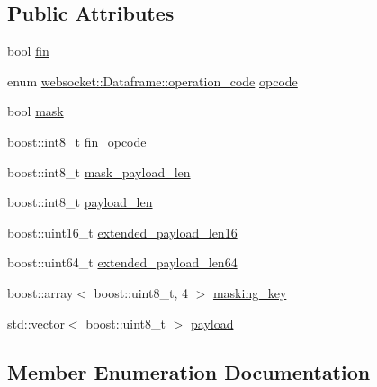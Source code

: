 \subsection*{Public Attributes}
\begin{DoxyCompactItemize}
\item 
bool \hyperlink{structwebsocket_1_1Dataframe_a76141c0d08271396a2497d5167b5c127}{fin}
\item 
enum \hyperlink{structwebsocket_1_1Dataframe_ab6f63b062b0aff036c2cbdecf160bd84}{websocket\+::\+Dataframe\+::operation\+\_\+code} \hyperlink{structwebsocket_1_1Dataframe_a5e3edcbe1a37e58024ec58f9f06dad38}{opcode}
\item 
bool \hyperlink{structwebsocket_1_1Dataframe_a49bc9113bc12db7e842ee0459f947aad}{mask}
\item 
boost\+::int8\+\_\+t \hyperlink{structwebsocket_1_1Dataframe_aae943445525774887619b133b4baed2d}{fin\+\_\+opcode}
\item 
boost\+::int8\+\_\+t \hyperlink{structwebsocket_1_1Dataframe_aef0527ee72ea7de1fe50914200bd3fcf}{mask\+\_\+payload\+\_\+len}
\item 
boost\+::int8\+\_\+t \hyperlink{structwebsocket_1_1Dataframe_ae8d89a8c10d3b372c09d65364613c716}{payload\+\_\+len}
\item 
boost\+::uint16\+\_\+t \hyperlink{structwebsocket_1_1Dataframe_a7dc588e87e310b596c4bcdc15d94c87d}{extended\+\_\+payload\+\_\+len16}
\item 
boost\+::uint64\+\_\+t \hyperlink{structwebsocket_1_1Dataframe_a2c3c0a890d9e982cf004eec1e85d47af}{extended\+\_\+payload\+\_\+len64}
\item 
boost\+::array$<$ boost\+::uint8\+\_\+t, 4 $>$ \hyperlink{structwebsocket_1_1Dataframe_ac57a24516f43eacf07e4a2273c5d014b}{masking\+\_\+key}
\item 
std\+::vector$<$ boost\+::uint8\+\_\+t $>$ \hyperlink{structwebsocket_1_1Dataframe_a809c2f387810fa2accd6602a290a6876}{payload}
\end{DoxyCompactItemize}


\subsection{Member Enumeration Documentation}
